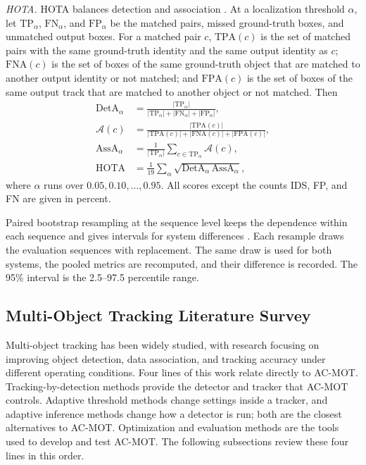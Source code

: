\documentclass[pdflatex,sn-mathphys-num,iicol]{sn-jnl}
\begin{document}
\emph{HOTA.} HOTA balances detection and association \cite{luiten2021hota}.
At a localization threshold $\alpha$, let $\mathrm{TP}_\alpha$,
$\mathrm{FN}_\alpha$, and $\mathrm{FP}_\alpha$ be the matched pairs, missed
ground-truth boxes, and unmatched output boxes. For a matched pair $c$,
$\mathrm{TPA}(c)$ is the set of matched pairs with the same ground-truth
identity and the same output identity as $c$; $\mathrm{FNA}(c)$ is the set of
boxes of the same ground-truth object that are matched to another output
identity or not matched; and $\mathrm{FPA}(c)$ is the set of boxes of the same
output track that are matched to another object or not matched. Then
\begin{align}
\mathrm{DetA}_\alpha&=\frac{|\mathrm{TP}_\alpha|}{|\mathrm{TP}_\alpha|+|\mathrm{FN}_\alpha|+|\mathrm{FP}_\alpha|},\label{eq:deta}\\
\mathcal{A}(c)&=\frac{|\mathrm{TPA}(c)|}{|\mathrm{TPA}(c)|+|\mathrm{FNA}(c)|+|\mathrm{FPA}(c)|},\label{eq:ac}\\
\mathrm{AssA}_\alpha&=\frac{1}{|\mathrm{TP}_\alpha|}\sum_{c\in\mathrm{TP}_\alpha}\mathcal{A}(c),\label{eq:assa}\\
\mathrm{HOTA}&=\frac{1}{19}\sum_{\alpha}\sqrt{\mathrm{DetA}_\alpha\,\mathrm{AssA}_\alpha},\label{eq:hota}
\end{align}
where $\alpha$ runs over $0.05, 0.10, \dots, 0.95$. All scores except the
counts IDS, FP, and FN are given in percent.

Paired bootstrap resampling at the sequence level keeps the dependence within
each sequence and gives intervals for system differences
\cite{efron1993bootstrap}. Each resample draws the evaluation sequences with
replacement. The same draw is used for both systems, the pooled metrics are
recomputed, and their difference is recorded. The 95\% interval is the
2.5--97.5 percentile range.

\subsection{Multi-Object Tracking Literature Survey}
Multi-object tracking has been widely studied, with research focusing on improving object detection, data association, and tracking accuracy under different operating conditions. Four lines of this work relate directly to AC-MOT. Tracking-by-detection methods provide the detector and tracker that AC-MOT controls. Adaptive threshold methods change settings inside a tracker, and adaptive inference methods change how a detector is run; both are the closest alternatives to AC-MOT. Optimization and evaluation methods are the tools used to develop and test AC-MOT. The following subsections review these four lines in this order.
\end{document}

